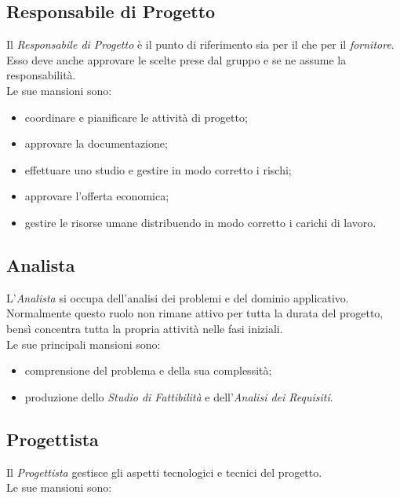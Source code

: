 \documentclass[./../NomeDocumento.tex]{subfiles}
\begin{document}
	\subsection {Responsabile di Progetto}
	
	Il \textit{Responsabile di Progetto} è il punto di riferimento sia per il  che per il \textit{fornitore}. Esso deve anche approvare le scelte prese dal gruppo e se ne assume la responsabilità. 
	\\ \noindent Le sue mansioni sono:
	
	\begin{itemize}
		\item coordinare e pianificare le attività di progetto;
		\item approvare la documentazione;
		\item effettuare uno studio e gestire in modo corretto i rischi;
		\item approvare l'offerta economica;
		\item gestire le risorse umane distribuendo in modo corretto i carichi di lavoro.
	\end{itemize}
	
	\subsection {Analista}
	
	L'\textit{Analista} si occupa dell'analisi dei problemi e del dominio applicativo. Normalmente questo ruolo non rimane attivo per tutta la durata del progetto, bensì concentra tutta la propria attività nelle fasi iniziali.
	\\ \noindent Le sue principali mansioni sono:
	
	\begin{itemize}
		\item comprensione del problema e della sua complessità;
		\item produzione dello \textit{Studio di Fattibilità} e dell'\textit{Analisi dei Requisiti}.
	\end{itemize}
	
	\subsection {Progettista}
	
	Il \textit{Progettista} gestisce gli aspetti tecnologici e tecnici del progetto.
	\\ \noindent Le sue mansioni sono:
	
\end{document}
